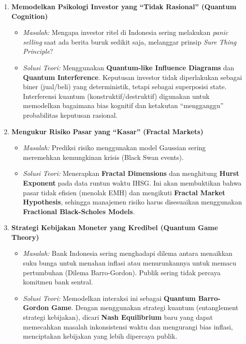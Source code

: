 \begin{enumerate}
    \item \textbf{Memodelkan Psikologi Investor yang ``Tidak Rasional'' (Quantum Cognition)}
    \begin{itemize}
        \item \textit{Masalah:} Mengapa investor ritel di Indonesia sering melakukan \textit{panic selling} saat ada berita buruk sedikit saja, melanggar prinsip \textit{Sure Thing Principle}?
        \item \textit{Solusi Teori:} Menggunakan \textbf{Quantum-like Influence Diagrams} dan \textbf{Quantum Interference}. Keputusan investor tidak diperlakukan sebagai biner (jual/beli) yang deterministik, tetapi sebagai superposisi state. Interferensi kuantum (konstruktif/destruktif) digunakan untuk memodelkan bagaimana bias kognitif dan ketakutan ``mengganggu'' probabilitas keputusan rasional.
    \end{itemize}

    \item \textbf{Mengukur Risiko Pasar yang ``Kasar'' (Fractal Markets)}
    \begin{itemize}
        \item \textit{Masalah:} Prediksi risiko menggunakan model Gaussian sering meremehkan kemungkinan krisis (Black Swan events).
        \item \textit{Solusi Teori:} Menerapkan \textbf{Fractal Dimensions} dan menghitung \textbf{Hurst Exponent} pada data runtun waktu IHSG. Ini akan membuktikan bahwa pasar tidak efisien (menolak EMH) dan mengikuti \textbf{Fractal Market Hypothesis}, sehingga manajemen risiko harus disesuaikan menggunakan \textbf{Fractional Black-Scholes Models}.
    \end{itemize}

    \item \textbf{Strategi Kebijakan Moneter yang Kredibel (Quantum Game Theory)}
    \begin{itemize}
        \item \textit{Masalah:} Bank Indonesia sering menghadapi dilema antara menaikkan suku bunga untuk menahan inflasi atau menurunkannya untuk memacu pertumbuhan (Dilema Barro-Gordon). Publik sering tidak percaya komitmen bank sentral.
        \item \textit{Solusi Teori:} Memodelkan interaksi ini sebagai \textbf{Quantum Barro-Gordon Game}. Dengan menggunakan strategi kuantum (entanglement strategi kebijakan), dicari \textbf{Nash Equilibrium} baru yang dapat memecahkan masalah inkonsistensi waktu dan mengurangi bias inflasi, menciptakan kebijakan yang lebih dipercaya publik.
    \end{itemize}


\end{enumerate}
